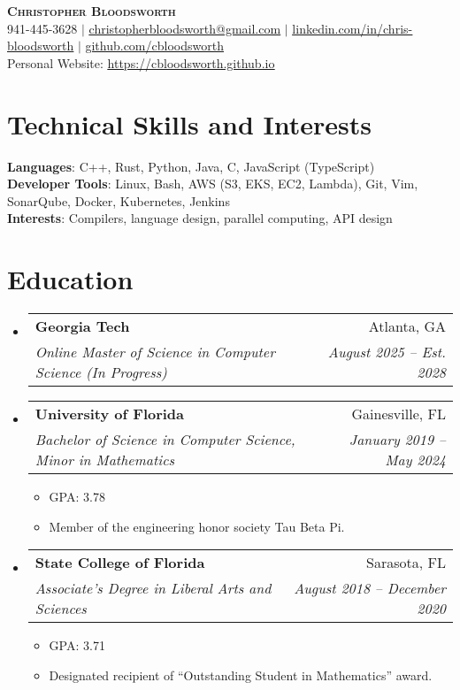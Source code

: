 \documentclass[letterpaper,11pt]{article}
\makeatletter
\newcommand{\resumeItem}[1]{
  \item\small{
    {#1 \vspace{-2pt}}
  }
}
\newcommand{\resumeSubheading}[4]{
  \vspace{-2pt}\item
    \begin{tabular*}{0.97\textwidth}[t]{l@{\extracolsep{\fill}}r}
      \textbf{#1} & #2 \\
      \textit{\small#3} & \textit{\small #4} \\
    \end{tabular*}\vspace{-7pt}
}
\newcommand{\resumeSubHeadingListStart}{\begin{itemize}[leftmargin=0.15in, label={}]}
\newcommand{\resumeSubHeadingListEnd}{\end{itemize}}
\newcommand{\resumeItemListStart}{\begin{itemize}}
\newcommand{\resumeItemListEnd}{\end{itemize}\vspace{-5pt}}
\makeatother
\begin{document}
\begin{center}
    \textbf{\Huge \scshape Christopher Bloodsworth} \\ \vspace{1pt}
    \small 941-445-3628 $|$ \href{christopherbloodsworth@gmail.com}{\underline{christopherbloodsworth@gmail.com}} $|$ 
    \href{https://www.linkedin.com/in/chris-bloodsworth/}{\underline{linkedin.com/in/chris-bloodsworth}} $|$
    \href{https://github.com/cbloodsworth}{\underline{github.com/cbloodsworth}} \\
    \small {Personal Website:} \href{https://cbloodsworth.github.io}{\underline{https://cbloodsworth.github.io}}
\end{center}

\section{Technical Skills and Interests}
 \begin{itemize}[leftmargin=0.15in, label={}]
    \small{\item{
     \textbf{Languages}{: C++, Rust, Python, Java, C, JavaScript (TypeScript)} \\
     \textbf{Developer Tools}{: Linux, Bash, AWS (S3, EKS, EC2, Lambda), Git, Vim, SonarQube, Docker, Kubernetes, Jenkins} \\
     \textbf{Interests}{: Compilers, language design, parallel computing, API design} \\
    }}
 \end{itemize}



\section{Education}
  \resumeSubHeadingListStart
    \resumeSubheading
      {Georgia Tech}{Atlanta, GA}
      {Online Master of Science in Computer Science (In Progress)}{August 2025 -- Est. 2028}
    \resumeSubheading
      {University of Florida}{Gainesville, FL}
      {Bachelor of Science in Computer Science, Minor in Mathematics}{January 2019 -- May 2024}
      \resumeItemListStart
        \resumeItem{GPA: 3.78}
        \resumeItem{Member of the engineering honor society Tau Beta Pi.}
      \resumeItemListEnd  
    \resumeSubheading
      {State College of Florida}{Sarasota, FL}
      {Associate's Degree in Liberal Arts and Sciences}{August 2018 -- December 2020}
      \resumeItemListStart
        \resumeItem{GPA: 3.71}
        \resumeItem{Designated recipient of “Outstanding Student in Mathematics” award.}
      \resumeItemListEnd  
  \resumeSubHeadingListEnd
\end{document}

